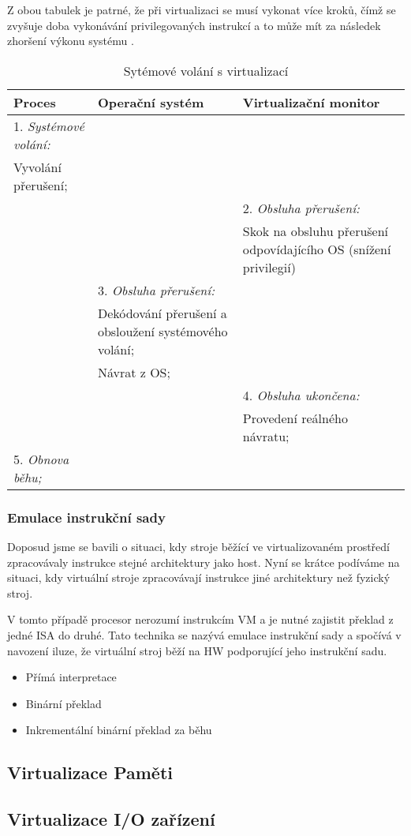 Z obou tabulek je patrné, že při virtualizaci se musí vykonat více kroků, čímž se zvyšuje doba vykonávání privilegovaných instrukcí a to může mít za následek zhoršení výkonu systému \cite{vmm_book}.

\begin{table}
    \centering    
    \begin{tabularx}{\textwidth}{XXX}
    Proces & Operační systém & Virtualizační monitor \\
    \hline
    1. \textit{Systémové volání:} && \\ Vyvolání přerušení; && \\
    && 2. \textit{Obsluha přerušení:} \\ && Skok na obsluhu přerušení odpovídajícího OS (snížení privilegií) \\    
    & 3. \textit{Obsluha přerušení:} & \\ & Dekódování přerušení a obsloužení systémového volání; & \\ & Návrat z OS; & \\
    && 4. \textit{Obsluha ukončena:} \\ && Provedení reálného návratu;\\
    5. \textit{Obnova běhu;} &&\\
    \end{tabularx}

    \caption[Sytémové volání s virtualizací]{Sytémové volání s virtualizací \cite{vmm_book}}
    \label{table:syscall_virt}
\end{table}


\subsubsection{Emulace instrukční sady}
\label{isa_emulation}

Doposud jsme se bavili o situaci, kdy stroje běžící ve virtualizovaném prostředí zpracovávaly instrukce stejné architektury jako host. Nyní se krátce podíváme na situaci, kdy virtuální stroje zpracovávají instrukce
jiné architektury než fyzický stroj.

V tomto případě procesor nerozumí instrukcím VM a je nutné zajistit překlad z jedné ISA do druhé. Tato technika se nazývá emulace instrukční sady a spočívá v navození iluze, že virtuální stroj běží
na HW podporující jeho instrukční sadu. 



\begin{itemize}
 \item Přímá interpretace
 \item Binární překlad
 \item Inkrementální binární překlad za běhu
\end{itemize}


\cite{virt3}



\subsection{Virtualizace Paměti}
\subsection{Virtualizace I/O zařízení}


